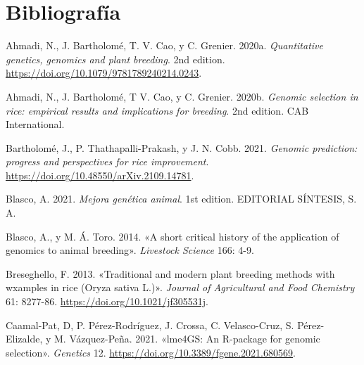 \documentclass[11pt,spanish,a4paper,oneside,]{book} %
\begin{document}
\backmatter

\hypertarget{bibliografuxeda}{%
\chapter*{Bibliografía}\label{bibliografuxeda}}

\begingroup
\hspace{\parindent}
\setlength{\parindent}{-0.25in}
\setlength{\leftskip}{0.25in}
\setlength{\parskip}{0pt}

\hypertarget{refs}{}
\leavevmode\hypertarget{ref-cite:33}{}%
Ahmadi, N., J. Bartholomé, T. V. Cao, y C. Grenier. 2020a. \emph{Quantitative genetics, genomics and plant breeding}. 2nd edition. \url{https://doi.org/10.1079/9781789240214.0243}.

\leavevmode\hypertarget{ref-cite:45}{}%
Ahmadi, N., J. Bartholomé, T V. Cao, y C. Grenier. 2020b. \emph{Genomic selection in rice: empirical results and implications for breeding}. 2nd edition. CAB International.

\leavevmode\hypertarget{ref-cite:58}{}%
Bartholomé, J., P. Thathapalli-Prakash, y J. N. Cobb. 2021. \emph{Genomic prediction: progress and perspectives for rice improvement}. \url{https://doi.org/10.48550/arXiv.2109.14781}.

\leavevmode\hypertarget{ref-cite:21}{}%
Blasco, A. 2021. \emph{Mejora genética animal}. 1st edition. EDITORIAL SÍNTESIS, S. A.

\leavevmode\hypertarget{ref-cite:3}{}%
Blasco, A., y M. Á. Toro. 2014. «A short critical history of the application of genomics to animal breeding». \emph{Livestock Science} 166: 4-9.

\leavevmode\hypertarget{ref-cite:57}{}%
Breseghello, F. 2013. «Traditional and modern plant breeding methods with wxamples in rice (Oryza sativa L.)». \emph{Journal of Agricultural and Food Chemistry} 61: 8277-86. \url{https://doi.org/10.1021/jf305531j}.

\leavevmode\hypertarget{ref-cite:51}{}%
Caamal-Pat, D, P. Pérez-Rodríguez, J. Crossa, C. Velasco-Cruz, S. Pérez-Elizalde, y M. Vázquez-Peña. 2021. «lme4GS: An R-package for genomic selection». \emph{Genetics} 12. \url{https://doi.org/10.3389/fgene.2021.680569}.
\end{document}
